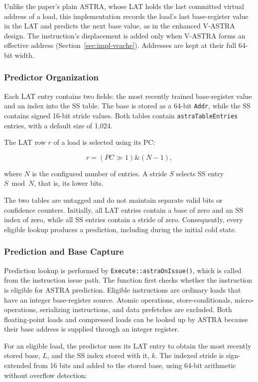 Unlike the paper's plain ASTRA, whose LAT holds the last committed
virtual address of a load, this implementation records the load's
last base-register value in the LAT and predicts the next base value,
as in the enhanced V-ASTRA design. The
instruction's displacement is added only when V-ASTRA forms an
effective address (Section~\ref{sec:impl-vcache}). Addresses are kept
at their full 64-bit width.

\subsubsection{Predictor Organization}

Each LAT entry contains two fields: the most recently trained
base-register value and an index into the SS table.
The base is stored as a 64-bit \texttt{Addr}, while the SS contains
signed 16-bit stride values. Both tables contain
\texttt{astraTableEntries} entries, with a default size of 1,024.

The LAT row \(r\) of a load is selected using its PC:

\[
    r = (PC \gg 1) \mathbin{\&} (N-1),
\]

where \(N\) is the configured number of entries. A stride \(S\)
selects SS entry \(S \bmod N\), that is, its lower bits.

The two tables are untagged and do not maintain separate valid
bits or confidence counters. Initially, all LAT entries contain
a base of zero and an SS index of zero, while all SS entries
contain a stride of zero. Consequently, every eligible lookup
produces a prediction, including during the initial cold state.

\subsubsection{Prediction and Base Capture}

Prediction lookup is performed by \texttt{Execute::astraOnIssue()},
which is called from the instruction issue path. The function first
checks whether the instruction is eligible for ASTRA prediction.
Eligible instructions are ordinary loads that have an integer
base-register source. Atomic operations, store-conditionals,
micro-operations, serializing instructions, and data prefetches
are excluded. Both floating-point loads and compressed loads
can be looked up by ASTRA because their base address is supplied
through an integer register.

For an eligible load, the predictor uses its LAT entry to obtain
the most recently stored base, \(L\), and the SS index stored with
it, \(k\). The indexed stride is
sign-extended from 16 bits and added to the stored base, using 64-bit
arithmetic without overflow detection:

